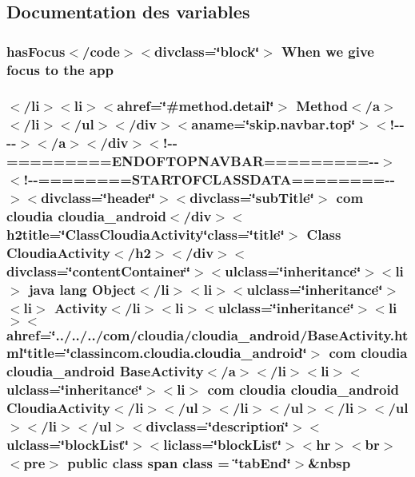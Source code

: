 \subsection{Documentation des variables}
\hypertarget{_cloudia_activity_8html_a788087bebea3161c6b9148d02d7652b0}{
\subsubsection[{app}]{\setlength{\rightskip}{0pt plus 5cm}has\-Focus$<$/code$>$$<$divclass=\char`\"{}block\char`\"{}$>$ When we give focus to the app}}\label{_cloudia_activity_8html_a788087bebea3161c6b9148d02d7652b0}
\hypertarget{_cloudia_activity_8html_a1bc4a6b8005ed1eead856146c6ce6879}{
\subsubsection[{class}]{\setlength{\rightskip}{0pt plus 5cm}$<$/li$>$$<$li$>$$<$ahref=\char`\"{}\#method.\-detail\char`\"{}$>$ Method$<$/{\bf a}$>$$<$/li$>$$<$/ul$>$$<$/div$>$$<$aname=\char`\"{}skip.\-navbar.\-top\char`\"{}$>$$<$!-\/-\/-\/-\/$>$$<$/a$>$$<$/div$>$$<$!-\/-\/=========E\-N\-D\-O\-F\-T\-O\-P\-N\-A\-V\-B\-A\-R=========-\/-\/$>$$<$!-\/-\/========S\-T\-A\-R\-T\-O\-F\-C\-L\-A\-S\-S\-D\-A\-T\-A========-\/-\/$>$$<$divclass=\char`\"{}header\char`\"{}$>$$<$divclass=\char`\"{}sub\-Title\char`\"{}$>$ com cloudia cloudia\-\_\-android$<$/div$>$$<$h2title=\char`\"{}Class\-Cloudia\-Activity\char`\"{}class=\char`\"{}title\char`\"{}$>$ Class {\bf Cloudia\-Activity}$<$/h2$>$$<$/div$>$$<$divclass=\char`\"{}content\-Container\char`\"{}$>$$<$ulclass=\char`\"{}inheritance\char`\"{}$>$$<$li$>$ java lang Object$<$/li$>$$<$li$>$$<$ulclass=\char`\"{}inheritance\char`\"{}$>$$<$li$>$ Activity$<$/li$>$$<$li$>$$<$ulclass=\char`\"{}inheritance\char`\"{}$>$$<$li$>$$<$ahref=\char`\"{}../../../com/cloudia/cloudia\-\_\-android/Base\-Activity.\-html\char`\"{}title=\char`\"{}classincom.\-cloudia.\-cloudia\-\_\-android\char`\"{}$>$ com cloudia cloudia\-\_\-android {\bf Base\-Activity}$<$/{\bf a}$>$$<$/li$>$$<$li$>$$<$ulclass=\char`\"{}inheritance\char`\"{}$>$$<$li$>$ com cloudia cloudia\-\_\-android {\bf Cloudia\-Activity}$<$/li$>$$<$/ul$>$$<$/li$>$$<$/ul$>$$<$/li$>$$<$/ul$>$$<$/li$>$$<$/ul$>$$<$divclass=\char`\"{}description\char`\"{}$>$$<$ulclass=\char`\"{}block\-List\char`\"{}$>$$<$liclass=\char`\"{}block\-List\char`\"{}$>$$<$hr$>$$<$br$>$$<$pre$>$ public class {\bf span} class = \char`\"{}tab\-End\char`\"{}$>$\&nbsp}}\label{_cloudia_activity_8html_a1bc4a6b8005ed1eead856146c6ce6879}
